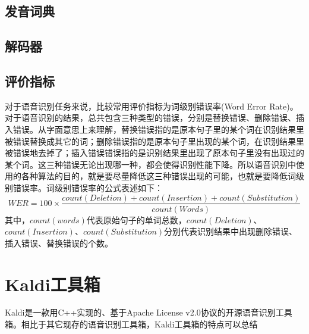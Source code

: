 \subsection{发音词典}

\subsection{解码器}

\subsection{评价指标}
对于语音识别任务来说，比较常用评价指标为词级别错误率(Word Error Rate)。对于语音识别的结果，总共包含三种类型的错误，分别是替换错误、删除错误、插入错误。从字面意思上来理解，替换错误指的是原本句子里的某个词在识别结果里被错误替换成其它的词；删除错误指的是原本句子里出现的某个词，在识别结果里被错误地去掉了；插入错误错误指的是识别结果里出现了原本句子里没有出现过的某个词。这三种错误无论出现哪一种，都会使得识别性能下降。所以语音识别中使用的各种算法的目的，就是要尽量降低这三种错误出现的可能，也就是要降低词级别错误率。词级别错误率的公式表述如下：
\begin{equation}WER=100\times\frac{count(Deletion)+count(Insertion)+count(Substitution)}{count(Words)}\end{equation}
其中，$count(words)$代表原始句子的单词总数，$count(Deletion)$、$count(Insertion)$、$count(Substitution)$分别代表识别结果中出现删除错误、插入错误、替换错误的个数。
\section{Kaldi工具箱}
Kaldi是一款用C++实现的、基于Apache License v2.0协议的开源语音识别工具箱。相比于其它现存的语音识别工具箱，Kaldi工具箱的特点可以总结
